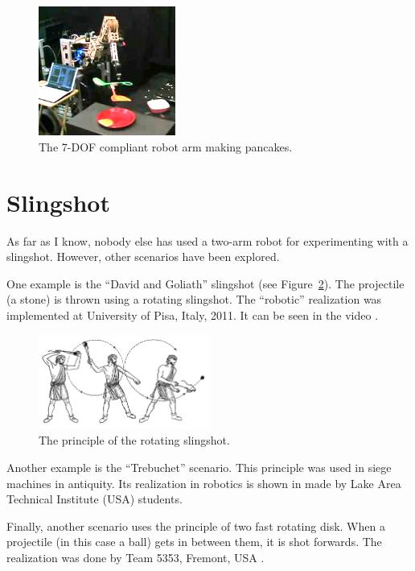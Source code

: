         \begin{figure}[h]
        \includegraphics[width=0.4\textwidth]{RobotPancakes.png}
        \centering
        \caption{The 7-DOF compliant robot arm making pancakes.}
        \label{fig:RobotPancakes}
        \end{figure}

    \section{Slingshot}
        As far as I know, nobody else has used a two-arm robot for experimenting with a slingshot.
        However, other scenarios have been explored.

        One example is the ``David and Goliath'' slingshot (see Figure~\ref{fig:DavidsSlingshot}). The projectile (a stone) is thrown using a rotating slingshot. The ``robotic'' realization was implemented at University of Pisa, Italy, 2011. It can be seen in the video \cite{DavidLikeSlingshot}.

        \begin{figure}[h]
        \includegraphics[width=0.5\textwidth]{DavidsSlingshot.png}
        \centering
        \caption{The principle of the rotating slingshot.}
        \label{fig:DavidsSlingshot}
        \end{figure}


        Another example is the ``Trebuchet'' scenario. This principle was used in siege machines in antiquity. Its realization in robotics is shown in \cite{Trebuchet} made by Lake Area Technical Institute (USA) students.

        Finally, another scenario uses the principle of two fast rotating disk. When a projectile (in this case a ball) gets in between them, it is shot forwards. The realization was done by Team 5353, Fremont, USA \cite{TwoRotatingDisks}.


